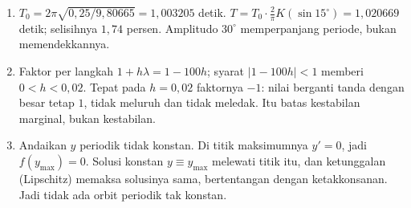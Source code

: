 \begin{enumerate}[label=\textbf{16.\arabic*}]
  \item $T_{0}=2\pi\sqrt{0{,}25/9{,}80665}=1{,}003205$ detik.
        $T=T_{0}\cdot\tfrac{2}{\pi}K(\sin15^{\circ})=1{,}020669$ detik; selisihnya
        $1{,}74$ persen. Amplitudo $30^{\circ}$ memperpanjang periode, bukan
        memendekkannya.

  \item Faktor per langkah $1+h\lambda=1-100h$; syarat $|1-100h|<1$ memberi
        $0<h<0{,}02$. Tepat pada $h=0{,}02$ faktornya $-1$: nilai berganti tanda
        dengan besar tetap $1$, tidak meluruh dan tidak meledak. Itu batas
        kestabilan marginal, bukan kestabilan.

  \item Andaikan $y$ periodik tidak konstan. Di titik maksimumnya $y'=0$, jadi
        $f(y_{\max})=0$. Solusi konstan $y\equiv y_{\max}$ melewati titik itu, dan
        ketunggalan (Lipschitz) memaksa solusinya sama, bertentangan dengan
        ketakkonsanan. Jadi tidak ada orbit periodik tak konstan.
\end{enumerate}

